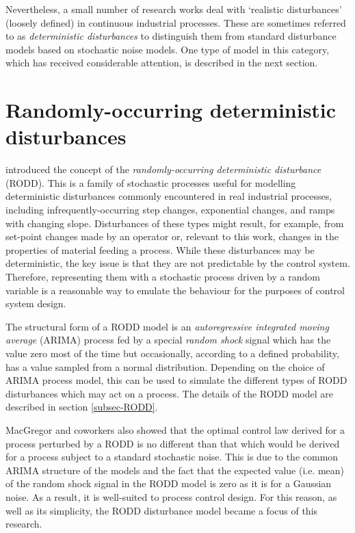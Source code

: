 Nevertheless, a small number of research works deal with `realistic disturbances' (loosely defined) in continuous industrial processes. These are sometimes referred to as \textit{deterministic disturbances} to distinguish them from standard disturbance models based on stochastic noise models. One type of model in this category, which has received considerable attention, is described in the next section.


\section*{Randomly-occurring deterministic disturbances} \label{RODDs}

\cite{macgregor_duality_1984} introduced the concept of the \textit{randomly-occurring deterministic disturbance} (RODD). This is a family of stochastic processes useful for modelling deterministic disturbances commonly encountered in real industrial processes, including  infrequently-occurring step changes, exponential changes, and ramps with changing slope. Disturbances of these types might result, for example, from set-point changes made by an operator or, relevant to this work, changes in the properties of material feeding a process. While these disturbances may be deterministic, the key issue is that they are not predictable by the control system. Therefore, representing them with a stochastic process driven by a random variable is a reasonable way to emulate the behaviour for the purposes of control system design.

The structural form of a RODD model is an \textit{autoregressive integrated moving average} (ARIMA) process fed by a special \textit{random shock} signal which has the value zero most of the time but occasionally, according to a defined probability, has a value sampled from a normal distribution. Depending on the choice of ARIMA process model, this can be used to simulate the different types of RODD disturbances which may act on a process. The details of the RODD model are described in section \ref{subsec-RODD}.

MacGregor and coworkers also showed that the optimal control law derived for a process perturbed by a RODD is no different than that which would be derived for a process subject to a standard stochastic noise.  This is due to the common ARIMA structure of the models and the fact that the expected value (i.e. mean) of the random shock signal in the RODD model is zero as it is for a Gaussian noise. As a result, it is well-suited to process control design. For this reason, as well as its simplicity, the RODD disturbance model became a focus of this research.

